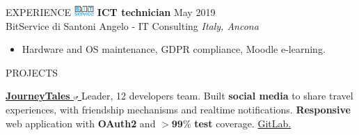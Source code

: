 \documentclass{cv} %
\begin{document}
\begin{minipage}[b][0.9\paperheight][t]{0.7\linewidth}
\begin{rSection}{EXPERIENCE}
    \includegraphics[width=0.75cm, trim={0cm 1.5cm 0cm 0cm}]{bitservice-icon.png}
    \textbf{ICT technician} \hfill May 2019 \\
    \hspace*{0.85cm}BitService di Santoni Angelo - IT Consulting \hfill \textit{Italy, Ancona}
    \begin{itemize}
        \item Hardware and OS maintenance, GDPR compliance, Moodle e-learning.
    \end{itemize}
\end{rSection}

\begin{rSection}{PROJECTS}
    \item \textbf{\href{https://pufferfish.sa4.usi.ch/login}
        {
            JourneyTales
            \includegraphics[width=0.15cm, trim={10cm -10cm 0cm 0cm}]{ext-link-icon.png}
        }}
    {Leader, 12 developers team.
        Built \textbf{social media} to share travel experiences,
        with friendship mechanisms and realtime notifications.
        \textbf{Responsive} web application with \textbf{OAuth2} and $\boldsymbol{> 99\%}$ \textbf{test} coverage.
        \href{https://gitlab.com/usi-si-oss/teaching/projects-showcase/sa4/team-4-pufferfish}{GitLab.}
    }%


\end{rSection}
\end{minipage}
\end{document}
